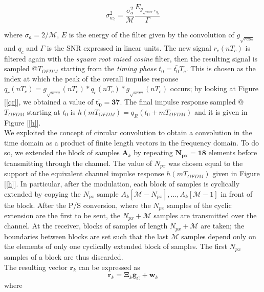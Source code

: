\documentclass[a4paper, 12pt]{report}
\begin{document}
\begin{equation}
\sigma^2_{w_c} = \frac{\sigma_a^2}{\mathcal{M}}\frac{E_{g_{\sqrt{rcos}* q_c}}}{\Gamma}
\end{equation}

where $\sigma_a=2/\mathcal{M}$, $E$ is the energy of the filter given by the convolution of $g_{\sqrt{rcos}}$ and $q_c$ and $\Gamma$ is the SNR expressed in linear units. The new signal $r_c(nT_c)$ is filtered again with the \textit{square root raised cosine} filter, then the resulting signal is sampled @$T_{OFDM}$ starting from the \textit{timing phase} $t_0 = \bar{t_0}T_c$. This is chosen as the index at which the peak of the overall impulse response $q_r(nT_c) = g_{\sqrt{srrc}}(nT_c)*q_c(nT_c)*g_{\sqrt{srrc}}(nT_c)$ occurs; by looking at Figure [\ref{qr}], we obtained a value of $\mathbf{\bar{t_0}=37}$. The final impulse response sampled @$T_{OFDM}$ starting at $t_0$ is $h(mT_{OFDM}) = q_R(t_0+mT_{OFDM})$ and it is given in Figure [\ref{h}].
\\

We exploited the concept of circular convolution to obtain a convolution in the time domain as a product of finite length vectors in the frequency domain. To do so, we extended the block of samples $\mathbf{A}_k$ by repeating $\mathbf{N_{px}=18}$ elements before transmitting through the channel. The value of $N_{px}$ was chosen equal to the support of the equivalent channel impulse response $h(mT_{OFDM})$ given in Figure [\ref{h}]. In particular, after the modulation, each block of samples is cyclically extended by copying the $N_{px}$ sample $A_k[\mathcal{M}-N_{px}],\dots,A_k[\mathcal{M}-1]$ in front of the block. After the P/S conversion, where the $N_{px}$ samples of the cyclic extension are the first to be sent, the $N_{px}+\mathcal{M}$ samples are transmitted over the channel.  At the receiver, blocks of samples of length $N_{px}+\mathcal{M}$ are taken; the boundaries between blocks are set such that the last $\mathcal{M}$ samples depend only on the elements of only one cyclically extended block of samples. The first $N_{px}$ samples of a block are thus discarded. \\
The resulting vector $\mathbf{r}_k$ can be expressed as 
\begin{equation}
\mathbf{r}_k = \mathbf{\Xi}_k\mathbf{g}_C + \mathbf{w}_k
\end{equation}
where 
\end{document}
